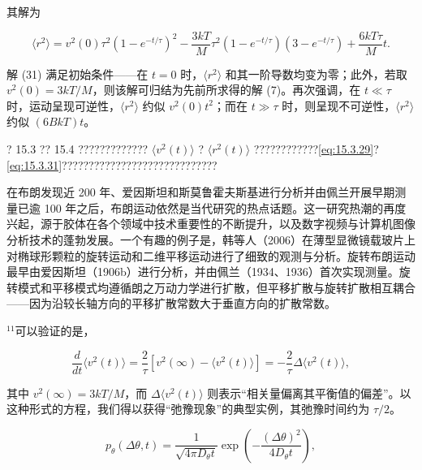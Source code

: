 其解为

\begin{equation}\tag{15.3.31}\label{eq:15.3.31}
\langle r ^{2} \rangle = v ^{2} ( 0 ) \tau ^{2} ( 1 - e ^{- t / \tau} ) ^{2} - \frac { 3 k T } { M } \tau ^{2} ( 1 - e ^{- t / \tau} ) ( 3 - e ^{- t / \tau} ) + \frac { 6 k T \tau } { M } t .
\end{equation}

解 (31) 满足初始条件------在 \(t=0\) 时，\(\langle r^{2}\rangle\) 和其一阶导数均变为零；此外，若取 \(v^{2}(0)=3kT/M\)，则该解可归结为先前所求得的解 (7)。再次强调，在 \(t\ll\tau\) 时，运动呈现可逆性，\(\langle r^{2}\rangle\) 约似 \(v^{2}(0)t^{2}\)；而在 \(t\gg\tau\) 时，则呈现不可逆性，\(\langle r^{2}\rangle\) 约似 \((6BkT)t\)。

? 15.3 ?? 15.4 ????????????? \(\langle v^{2}(t)\rangle\) ? \(\langle r^{2}(t)\rangle\) ????????????\autoref{eq:15.3.29}?\autoref{eq:15.3.31}?????????????????????????????

在布朗发现近 200 年、爱因斯坦和斯莫鲁霍夫斯基进行分析并由佩兰开展早期测量已逾 100 年之后，布朗运动依然是当代研究的热点话题。这一研究热潮的再度兴起，源于胶体在各个领域中技术重要性的不断提升，以及数字视频与计算机图像分析技术的蓬勃发展。一个有趣的例子是，韩等人（2006）在薄型显微镜载玻片上对椭球形颗粒的旋转运动和二维平移运动进行了细致的观测与分析。旋转布朗运动最早由爱因斯坦（1906b）进行分析，并由佩兰（1934、1936）首次实现测量。旋转模式和平移模式均遵循朗之万动力学进行扩散，但平移扩散与旋转扩散相互耦合------因为沿较长轴方向的平移扩散常数大于垂直方向的扩散常数。

\(^{11}\)可以验证的是，

\begin{equation}\tag{15.3.32}\label{eq:15.3.32}
\frac { d } { d t } \langle v ^{2} ( t ) \rangle = \frac { 2 } { \tau } \left[ v ^{2} ( \infty ) - \langle v ^{2} ( t ) \rangle \right] = - \frac { 2 } { \tau } \Delta \langle v ^{2} ( t ) \rangle ,
\end{equation}

其中 \(v^{2}(\infty)=3kT/M\)，而 \(\Delta\langle v^{2}(t)\rangle\) 则表示``相关量偏离其平衡值的偏差''。以这种形式的方程，我们得以获得``弛豫现象''的典型实例，其弛豫时间约为 \(\tau/2\)。

\begin{equation}
p _ { \theta } ( \Delta \theta , t ) = \frac { 1 } { \sqrt { 4 \pi D _ { \theta } t } } \exp \left( - \frac { ( \Delta \theta ) ^{2} } { 4 D _ { \theta } t } \right) ,
\end{equation}

